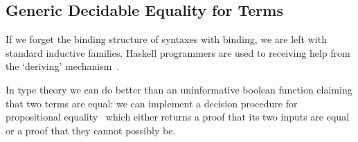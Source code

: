 \subsection{Generic Decidable Equality for Terms}

If we forget the binding structure of syntaxes with binding, we are left with
standard inductive families. Haskell programmers are used to receiving help
from the `deriving' mechanism~\cite{DBLP:journals/entcs/HinzeJ00,DBLP:conf/haskell/MagalhaesDJL10}.

In type theory we can do better than an uninformative boolean function claiming
that two terms are equal: we can implement a decision procedure for propositional
equality~\cite{DBLP:conf/icfp/LohM11} which either returns a proof that its two
inputs are equal or a proof that they cannot possibly be.
